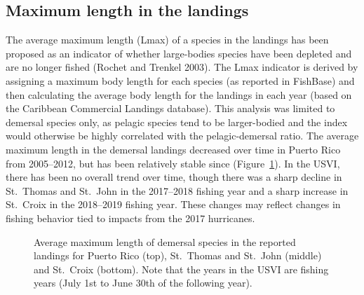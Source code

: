 \documentclass[
  letterpaper,
  oneside,
  open=any]{scrbook}
\begin{document}
\subsection{Maximum length in the
landings}\label{maximum-length-in-the-landings}

The average maximum length (Lmax) of a species in the landings has been
proposed as an indicator of whether large-bodies species have been
depleted and are no longer fished (Rochet and Trenkel 2003). The Lmax
indicator is derived by assigning a maximum body length for each species
(as reported in FishBase) and then calculating the average body length
for the landings in each year (based on the Caribbean Commercial
Landings database). This analysis was limited to demersal species only,
as pelagic species tend to be larger-bodied and the index would
otherwise be highly correlated with the pelagic-demersal ratio. The
average maximum length in the demersal landings decreased over time in
Puerto Rico from 2005--2012, but has been relatively stable since
(Figure~\ref{fig-avgLmax}). In the USVI, there has been no overall trend
over time, though there was a sharp decline in St.~Thomas and St.~John
in the 2017--2018 fishing year and a sharp increase in St.~Croix in the
2018--2019 fishing year. These changes may reflect changes in fishing
behavior tied to impacts from the 2017 hurricanes.

\begin{figure}


\caption{\label{fig-avgLmax}Average maximum length of demersal species
in the reported landings for Puerto Rico (top), St.~Thomas and St.~John
(middle) and St.~Croix (bottom). Note that the years in the USVI are
fishing years (July 1st to June 30th of the following year).}

\end{figure}%
\end{document}
